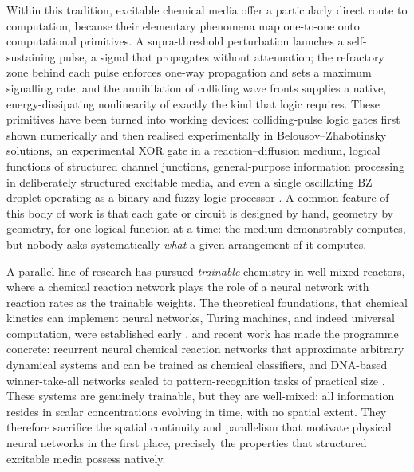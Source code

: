 Within this tradition, excitable chemical media offer a particularly direct route to computation, because their elementary phenomena map one-to-one onto computational primitives. 
A supra-threshold perturbation launches a self-sustaining pulse, a signal that propagates without attenuation; the refractory zone behind each pulse enforces one-way propagation and sets a maximum signalling rate; and the annihilation of colliding wave fronts supplies a native, energy-dissipating nonlinearity of exactly the kind that logic requires. 
These primitives have been turned into working devices: colliding-pulse logic gates first shown numerically and then realised experimentally in Belousov--Zhabotinsky solutions, an experimental XOR gate in a reaction--diffusion medium, logical functions of structured channel junctions, general-purpose information processing in deliberately structured excitable media, and even a single oscillating BZ droplet operating as a binary and fuzzy logic processor \cite{toth1995logic, steinbock1996chemical, adamatzky2002xor, adamatzky2002collision, sielewiesiuk2001logical, gorecki2009information, gentili2012chemical}. 
A common feature of this body of work is that each gate or circuit is designed by hand, geometry by geometry, for one logical function at a time: the medium demonstrably computes, but nobody asks systematically \emph{what} a given arrangement of it computes.

A parallel line of research has pursued \emph{trainable} chemistry in well-mixed reactors, where a chemical reaction network plays the role of a neural network with reaction rates as the trainable weights. 
The theoretical foundations, that chemical kinetics can implement neural networks, Turing machines, and indeed universal computation, were established early \cite{hjelmfelt1991chemical, magnasco1997chemical}, and recent work has made the programme concrete: recurrent neural chemical reaction networks that approximate arbitrary dynamical systems and can be trained as chemical classifiers, and DNA-based winner-take-all networks scaled to pattern-recognition tasks of practical size \cite{dack2024rncrn, cherry2018scaling}. 
These systems are genuinely trainable, but they are well-mixed: all information resides in scalar concentrations evolving in time, with no spatial extent. 
They therefore sacrifice the spatial continuity and parallelism that motivate physical neural networks in the first place, precisely the properties that structured excitable media possess natively.

